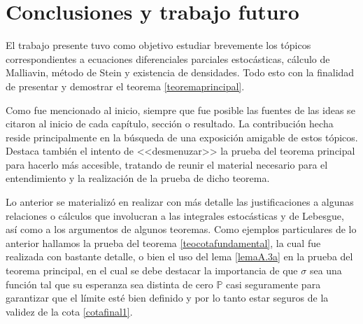 \documentclass[letterpaper,twoside,12pt]{book}
\renewcommand{\P}{\mathbb{P}}
\newcommand{\1}{\mathds{1}}
\theoremstyle{definition}
\theoremstyle{definition}
\theoremstyle{remark}
\theoremstyle{definition}
\theoremstyle{definition}
\theoremstyle{definition}
\theoremstyle{definition}
\theoremstyle{definition}
\begin{document}


\chapter{Conclusiones y trabajo futuro}
El trabajo presente tuvo como objetivo estudiar brevemente los tópicos correspondientes a ecuaciones diferenciales parciales estocásticas, cálculo de Malliavin, método de Stein y existencia de densidades. Todo esto con la finalidad de presentar y demostrar el teorema \ref{teoremaprincipal}. 

Como fue mencionado al inicio, siempre que fue posible las fuentes de las ideas se citaron al inicio de cada capítulo, sección o resultado. La contribución hecha reside principalmente en la búsqueda de una exposición amigable de estos tópicos. Destaca también el intento de <<desmenuzar>> la prueba del teorema principal para hacerlo más accesible, tratando de reunir el material necesario para el entendimiento y la realización de la prueba de dicho teorema.

Lo anterior se materializó en realizar con más detalle las justificaciones a algunas relaciones o cálculos que involucran a las integrales estocásticas y de Lebesgue, así como a los argumentos de algunos teoremas. Como ejemplos particulares de lo anterior hallamos la prueba del teorema \ref{teocotafundamental}, la cual fue realizada con bastante detalle, o bien el uso del lema \ref{lemaA.3a} en la prueba del teorema principal, en el cual se debe destacar la importancia de que $\sigma$ sea una función tal que su esperanza sea distinta de cero $\P$ casi seguramente para garantizar que el límite esté bien definido y por lo tanto estar seguros de la validez de la cota \eqref{cotafinal1}.
\end{document}
